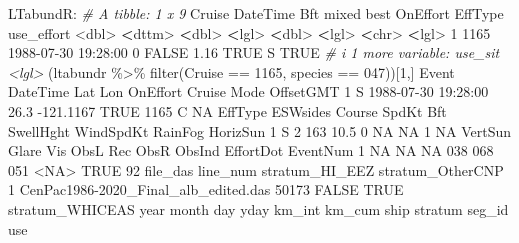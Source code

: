 \documentclass[
]{book}
\newenvironment{Shaded}{\begin{snugshade}}{\end{snugshade}}
\newcommand{\CommentTok}[1]{\textcolor[rgb]{0.56,0.35,0.01}{\textit{#1}}}
\newcommand{\ConstantTok}[1]{\textcolor[rgb]{0.00,0.00,0.00}{#1}}
\newcommand{\DecValTok}[1]{\textcolor[rgb]{0.00,0.00,0.81}{#1}}
\newcommand{\ErrorTok}[1]{\textcolor[rgb]{0.64,0.00,0.00}{\textbf{#1}}}
\newcommand{\FloatTok}[1]{\textcolor[rgb]{0.00,0.00,0.81}{#1}}
\newcommand{\FunctionTok}[1]{\textcolor[rgb]{0.00,0.00,0.00}{#1}}
\newcommand{\NormalTok}[1]{#1}
\newcommand{\SpecialCharTok}[1]{\textcolor[rgb]{0.00,0.00,0.00}{#1}}
\newcommand{\StringTok}[1]{\textcolor[rgb]{0.31,0.60,0.02}{#1}}
\begin{document}
\begin{Shaded}
\begin{Highlighting}[]
\NormalTok{LTabundR}\SpecialCharTok{:}
\CommentTok{\# A tibble: 1 x 9}
\NormalTok{  Cruise DateTime              Bft mixed  best OnEffort EffType use\_effort}
   \SpecialCharTok{\textless{}}\NormalTok{dbl}\SpecialCharTok{\textgreater{}} \ErrorTok{\textless{}}\NormalTok{dttm}\SpecialCharTok{\textgreater{}}              \ErrorTok{\textless{}}\NormalTok{dbl}\SpecialCharTok{\textgreater{}} \ErrorTok{\textless{}}\NormalTok{lgl}\SpecialCharTok{\textgreater{}} \ErrorTok{\textless{}}\NormalTok{dbl}\SpecialCharTok{\textgreater{}} \ErrorTok{\textless{}}\NormalTok{lgl}\SpecialCharTok{\textgreater{}}    \ErrorTok{\textless{}}\NormalTok{chr}\SpecialCharTok{\textgreater{}}   \ErrorTok{\textless{}}\NormalTok{lgl}\SpecialCharTok{\textgreater{}}     
\DecValTok{1}   \DecValTok{1165} \DecValTok{1988{-}07{-}30} \DecValTok{19}\SpecialCharTok{:}\DecValTok{28}\SpecialCharTok{:}\DecValTok{00}     \DecValTok{0} \ConstantTok{FALSE}  \FloatTok{1.16} \ConstantTok{TRUE}\NormalTok{     S       }\ConstantTok{TRUE}      
\CommentTok{\# i 1 more variable: use\_sit \textless{}lgl\textgreater{}}
\NormalTok{(ltabundr }\SpecialCharTok{\%\textgreater{}\%} \FunctionTok{filter}\NormalTok{(Cruise }\SpecialCharTok{==} \DecValTok{1165}\NormalTok{, species }\SpecialCharTok{==} \StringTok{\textquotesingle{}047\textquotesingle{}}\NormalTok{))[}\DecValTok{1}\NormalTok{,]}
\NormalTok{  Event            DateTime  Lat       Lon OnEffort Cruise Mode OffsetGMT}
\DecValTok{1}\NormalTok{     S }\DecValTok{1988{-}07{-}30} \DecValTok{19}\SpecialCharTok{:}\DecValTok{28}\SpecialCharTok{:}\DecValTok{00} \FloatTok{26.3} \SpecialCharTok{{-}}\FloatTok{121.1167}     \ConstantTok{TRUE}   \DecValTok{1165}\NormalTok{    C        }\ConstantTok{NA}
\NormalTok{  EffType ESWsides Course SpdKt Bft SwellHght WindSpdKt RainFog HorizSun}
\DecValTok{1}\NormalTok{       S        }\DecValTok{2}    \DecValTok{163}  \FloatTok{10.5}   \DecValTok{0}        \ConstantTok{NA}        \ConstantTok{NA}       \DecValTok{1}       \ConstantTok{NA}
\NormalTok{  VertSun Glare Vis ObsL Rec ObsR ObsInd EffortDot EventNum}
\DecValTok{1}      \ConstantTok{NA}    \ConstantTok{NA}  \ConstantTok{NA}  \DecValTok{038} \DecValTok{068}  \DecValTok{051}   \SpecialCharTok{\textless{}}\ConstantTok{NA}\SpecialCharTok{\textgreater{}}      \ConstantTok{TRUE}       \DecValTok{92}
\NormalTok{                              file\_das line\_num stratum\_HI\_EEZ stratum\_OtherCNP}
\DecValTok{1}\NormalTok{ CenPac1986}\SpecialCharTok{{-}}\NormalTok{2020\_Final\_alb\_edited.das    }\DecValTok{50173}          \ConstantTok{FALSE}             \ConstantTok{TRUE}
\NormalTok{  stratum\_WHICEAS year month day yday km\_int   km\_cum ship  stratum seg\_id  use}

\end{Highlighting}
\end{Shaded}
\end{document}
